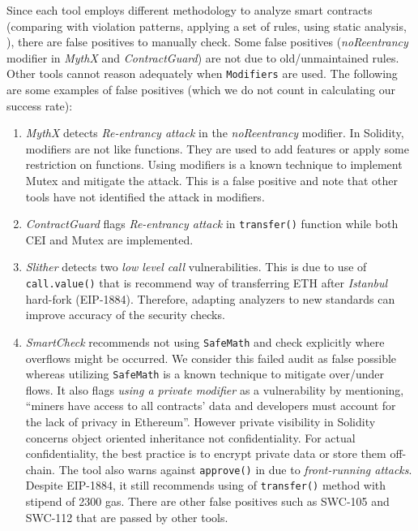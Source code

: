 Since each tool employs different methodology to analyze smart contracts (\eg comparing with violation patterns, applying a set of rules, using static analysis, \etc), there are false positives to manually check. Some false positives (\eg \textit{noReentrancy} modifier in \textit{MythX} and \textit{ContractGuard}) are not due to old/unmaintained rules. Other tools cannot reason adequately when \texttt{Modifiers} are used.  The following are some examples of false positives (which we do not count in calculating our success rate):
\begin{enumerate}[noitemsep,topsep=0pt]
	\item \textit{MythX} detects \textit{Re-entrancy attack} in the \textit{noReentrancy} modifier. In Solidity, modifiers are not like functions. They are used to add features or apply some restriction on functions\cite{SolidityModifer}. Using modifiers is a known technique to implement Mutex and mitigate the attack\cite{ReentrancyGuard}. This is a false positive and note that other tools have not identified the attack in modifiers.

	\item \textit{ContractGuard} flags \textit{Re-entrancy attack} in \texttt{transfer()} function while both CEI and Mutex are implemented.

	\item \textit{Slither} detects two \textit{low level call} vulnerabilities\cite{SlitherSetup}. This is due to use of \texttt{call.value()} that is recommend way of transferring ETH after \textit{Istanbul} hard-fork (EIP-1884).	Therefore, adapting analyzers to new standards can improve accuracy of the security checks.

	\item \textit{SmartCheck} recommends not using \texttt{SafeMath} and check explicitly where overflows might be occurred. We consider this failed audit as false possible whereas utilizing \texttt{SafeMath} is a known technique to mitigate over/under flows. It also flags \textit{using a private modifier} as a vulnerability by mentioning, ``miners have access to all contracts' data and developers must account for the lack of privacy in Ethereum''. However private visibility in Solidity concerns object oriented inheritance not confidentiality. For actual confidentiality, the best practice is to encrypt private data or store them off-chain. The tool also warns against \texttt{approve()} in \erc due to \textit{front-running attacks}. Despite EIP-1884, it still recommends using of \texttt{transfer()} method with stipend of 2300 gas. There are other false positives such as SWC-105 and SWC-112 that are passed by other tools.


\end{enumerate}
